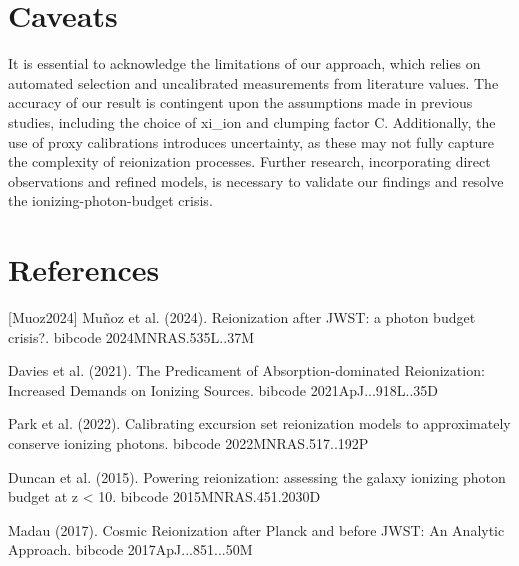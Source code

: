 \documentclass[twocolumn]{aastex631}
\begin{document}
\section{Caveats}
It is essential to acknowledge the limitations of our approach, which relies on automated selection and uncalibrated measurements from literature values. The accuracy of our result is contingent upon the assumptions made in previous studies, including the choice of xi\_ion and clumping factor C. Additionally, the use of proxy calibrations introduces uncertainty, as these may not fully capture the complexity of reionization processes. Further research, incorporating direct observations and refined models, is necessary to validate our findings and resolve the ionizing-photon-budget crisis.
\section*{References}
\footnotesize
[Muoz2024] Muñoz et al. (2024). Reionization after JWST: a photon budget crisis?. bibcode 2024MNRAS.535L..37M \par [Davies2021] Davies et al. (2021). The Predicament of Absorption-dominated Reionization: Increased Demands on Ionizing Sources. bibcode 2021ApJ...918L..35D \par [Park2022] Park et al. (2022). Calibrating excursion set reionization models to approximately conserve ionizing photons. bibcode 2022MNRAS.517..192P \par [Duncan2015] Duncan et al. (2015). Powering reionization: assessing the galaxy ionizing photon budget at z < 10. bibcode 2015MNRAS.451.2030D \par [Madau2017] Madau (2017). Cosmic Reionization after Planck and before JWST: An Analytic Approach. bibcode 2017ApJ...851...50M
\end{document}

